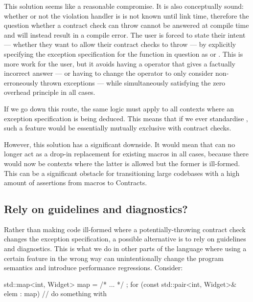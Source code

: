 This solution seems like a reasonable compromise. It is also conceptually sound: whether or not the violation handler is  is not known until link time, therefore the question whether a contract check can throw cannot be answered at compile time and will instead result in a compile error. The user is forced to state their intent --- whether they want to allow their contract checks to throw --- by explicitly specifying the exception specification for the function in question as  or . This is more work for the user, but it avoids having a  operator that gives a factually incorrect answer --- or having to change the  operator to only consider non-erroneously thrown exceptions --- while simultaneously satisfying the zero overhead principle in all cases.

If we go down this route, the same logic must apply to all contexts where an exception specification is being deduced. This means that if we ever standardise , such a feature would be essentially mutually exclusive with contract checks.

However, this solution has a significant downside. It would mean that  can no longer act as a drop-in replacement for existing  macros in all cases, because there would now be contexts where the latter is allowed but the former is ill-formed. This can be a significant obstacle for transitioning large codebases with a high amount of assertions from macros to Contracts.

\subsection{Rely on guidelines and diagnostics?}

Rather than making code ill-formed where a potentially-throwing contract check changes the exception specification, a possible alternative is to rely on guidelines and diagnostics. This is what we do in other parts of the language where using a certain feature in the wrong way can unintentionally change the program semantics and introduce performance regressions. Consider:

\begin{codeblock}
std::map<int, Widget> map = { /* ... */ };
for (const std::pair<int, Widget>& elem : map)
  // do something with 
\end{codeblock}

